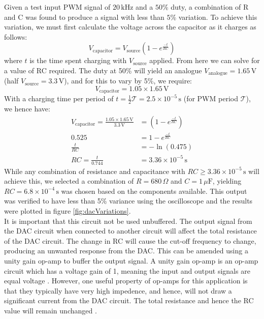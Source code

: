 \documentclass[%
 reprint,
 amsmath,amssymb,
 aps,
]{revtex4-2}
\begin{document}
    Given a test input PWM signal of $20\,\text{kHz}$ and a $50$\% duty, a combination of R and C was found to produce a signal with less than $5$\% variation. To achieve this variation, we must first calculate the voltage across the capacitor as it charges as follows:
    \begin{equation}
        V_\text{capacitor} = V_\text{source} \left( 1 - e^{\frac{-t}{RC}} \right)
    \end{equation}where $t$ is the time spent charging with $V_\text{source}$ applied. From here we can solve for a value of RC required. The duty at 50\% will yield an analogue $V_\text{analogue} = 1.65 \,\text{V}$ (half $V_\text{source}=3.3\,\text{V}$), and for this to vary by 5\%, we require:
    \begin{equation}
        V_\text{capacitor} = 1.05 \times 1.65 \,\text{V}
    \end{equation}
    With a charging time per period of $t = \frac{1}{2} \mathcal{T} = 2.5 \times 10^{-5} \,\text{s}$ (for PWM period $\mathcal{T}$), we hence have:
    \begin{align}
        V_\text{capacitor} = \frac{1.05 \times 1.65 \,\text{V}}{3.3\,\text{V}} &= \left( 1 - e^{\frac{-t}{RC}} \right)\\
        0.525 &= 1 - e^\frac{-t}{RC}\nonumber\\
        \frac{t}{RC} &= - \ln(0.475)\nonumber\\
        RC = \frac{t}{0.744} &= 3.36 \times 10^{-5} \,\text{s}
    \end{align}
    While any combination of resistance and capacitance with $RC \ge 3.36 \times 10^{-5} \,\text{s}$ will achieve this, we selected a combination of $R=680\,\Omega$ and $C=1\,\mu\text{F}$, yielding $RC=6.8\times 10^{-4}\,\text{s}$ was chosen based on the components available. This output was verified to have less than 5\% variance using the oscilloscope and the results were plotted in figure \ref{fig:dacVariations}.\\

    It is important that this circuit not be used unbuffered. The output signal from the DAC circuit when connected to another circuit will affect the total resistance of the DAC circuit. The change in RC will cause the cut-off frequency to change, producing an unwanted response from the DAC. This can be amended using a unity gain op-amp to buffer the output signal. A unity gain op-amp is an op-amp circuit which has a voltage gain of 1, meaning the input and output signals are equal voltage \cite{unityGain}. However, one useful property of op-amps for this application is that they typically have very high impedence, and hence, will not draw a significant current from the DAC circuit. The total resistance and hence the RC value will remain unchanged \cite{unityGain}.
\end{document}
